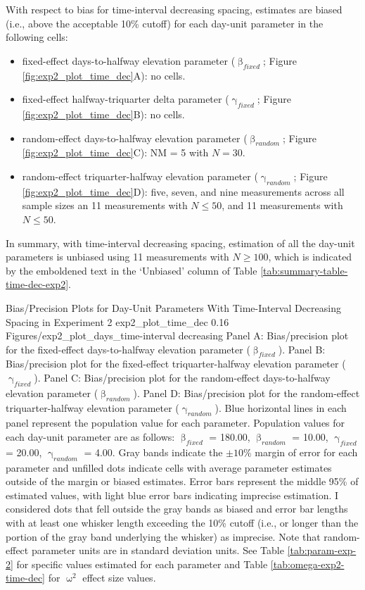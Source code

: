 \documentclass[
12pt, %
twoside,
english]{guelphthesis}
\begin{document}
With respect to bias for time-interval decreasing spacing, estimates are biased (i.e., above the acceptable 10\% cutoff) for each day-unit parameter in the following cells:
\begin{itemize}
\tightlist
\item
  fixed-effect days-to-halfway elevation parameter (\(\upbeta_{fixed}\); Figure \ref{fig:exp2_plot_time_dec}A): no cells.
\item
  fixed-effect halfway-triquarter delta parameter (\(\upgamma_{fixed}\); Figure \ref{fig:exp2_plot_time_dec}B): no cells.
\item
  random-effect days-to-halfway elevation parameter (\(\upbeta_{random}\); Figure \ref{fig:exp2_plot_time_dec}C): NM = 5 with \(N = 30\).\\
\item
  random-effect triquarter-halfway elevation parameter (\(\upgamma_{random}\); Figure \ref{fig:exp2_plot_time_dec}D): five, seven, and nine measurements across all sample sizes an 11 measurements with \(N \le 50\), and 11 measurements with \(N \le 50\).
\end{itemize}
In summary, with time-interval decreasing spacing, estimation of all the day-unit parameters is unbiased using 11 measurements with \(N \ge 100\), which is indicated by the emboldened text in the `Unbiased' column of Table \ref{tab:summary-table-time-dec-exp2}.
\begin{apaFigure}
[portrait]
[samepage]
[-0.2cm]
{Bias/Precision Plots for Day-Unit Parameters With Time-Interval Decreasing Spacing in Experiment 2}
{exp2_plot_time_dec}
{0.16}
{Figures/exp2_plot_days_time-interval decreasing}
{Panel A: Bias/precision plot for the fixed-effect days-to-halfway elevation parameter ($\upbeta_{fixed}$). Panel B: Bias/precision plot for the fixed-effect triquarter-halfway elevation parameter ($\upgamma_{fixed}$). Panel C: Bias/precision plot for the random-effect days-to-halfway elevation parameter ($\upbeta_{random}$). Panel D: Bias/precision plot for the random-effect triquarter-halfway elevation parameter ($\upgamma_{random}$). Blue horizontal lines in each panel represent the population value for each parameter. Population values for each day-unit parameter are as follows: $\upbeta_{fixed}$ = 180.00, $\upbeta_{random}$ = 10.00, $\upgamma_{fixed}$ = 20.00, $\upgamma_{random}$ = 4.00. Gray bands indicate the $\pm 10\%$ margin of error for each parameter and unfilled dots indicate cells with average parameter estimates outside of the margin or biased estimates. Error bars represent the middle 95\% of estimated values, with light blue error bars indicating imprecise estimation. I considered dots that fell outside the gray bands as biased and error bar lengths with at least one whisker length exceeding the 10\% cutoff (i.e., or longer than the portion of the gray band underlying the whisker) as imprecise. Note that random-effect parameter units are in standard deviation units. See Table \ref{tab:param-exp-2} for specific values estimated for each parameter and Table \ref{tab:omega-exp2-time-dec} for $\upomega^2$ effect size values.}
\end{apaFigure}
\end{document}
